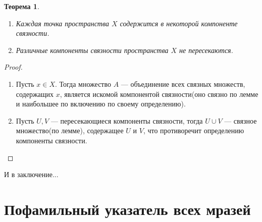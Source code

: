 \documentclass[a4paper,100pt]{article}
\theoremstyle{indented}
\newtheorem{theorem}{Теорема}
\begin{document}
    \begin{theorem}
        \begin{enumerate}
            \item Каждая точка пространства $X$ содержится в некоторой компоненте связности.
            \item Различные компоненты связности пространства $X$ не пересекаются.
        \end{enumerate}
    \end{theorem}
    
    \begin{proof} \textcolor{white}{-}\\
    \begin{enumerate}
        \item Пусть $x \in X$. Тогда множество $A$ --- объединение всех связных множеств, содержащих $x$, является искомой компонентой связности(оно связно по лемме и наибольшее по включению по своему определению).
        \item Пусть $U,V$ --- пересекающиеся компоненты связности, тогда $U \cup V$ --- связное множество(по лемме), содержащее $U$ и $V$, что противоречит определению компоненты связности.
    \end{enumerate}
    \end{proof}



\newpage

\hypertarget{t2}{И в заключение...}



\section{Пофамильный указатель всех мразей}
\end{document}
